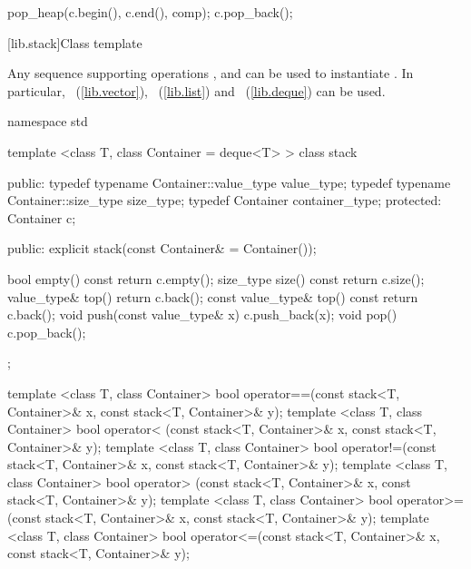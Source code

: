 \begin{itemdescr}
\pnum
\effects
\begin{codeblock}
        pop_heap(c.begin(), c.end(), comp);
        c.pop_back();
\end{codeblock}
\end{itemdescr}

[lib.stack]{Class template }

\pnum
{}%
Any sequence supporting operations
,
and
can be used to instantiate
.
In particular,
~(\ref{lib.vector}),
~(\ref{lib.list})
and
~(\ref{lib.deque})
can be used.

\begin{codeblock}
namespace std {
  template <class T, class Container = deque<T> >
  class stack {
  public:
    typedef typename Container::value_type            value_type;
    typedef typename Container::size_type             size_type;
    typedef          Container                        container_type;
  protected:
    Container c;

  public:
    explicit stack(const Container& = Container());

    bool      empty() const             { return c.empty(); }
    size_type size()  const             { return c.size(); }
    value_type&       top()             { return c.back(); }
    const value_type& top() const       { return c.back(); }
    void push(const value_type& x)      { c.push_back(x); }
    void pop()                          { c.pop_back(); }
  };

  template <class T, class Container>
    bool operator==(const stack<T, Container>& x,
                    const stack<T, Container>& y);
  template <class T, class Container>
    bool operator< (const stack<T, Container>& x,
                    const stack<T, Container>& y);
  template <class T, class Container>
    bool operator!=(const stack<T, Container>& x,
                    const stack<T, Container>& y);
  template <class T, class Container>
    bool operator> (const stack<T, Container>& x,
                    const stack<T, Container>& y);
  template <class T, class Container>
    bool operator>=(const stack<T, Container>& x,
                    const stack<T, Container>& y);
  template <class T, class Container>
    bool operator<=(const stack<T, Container>& x,
                    const stack<T, Container>& y);
}
\end{codeblock}

